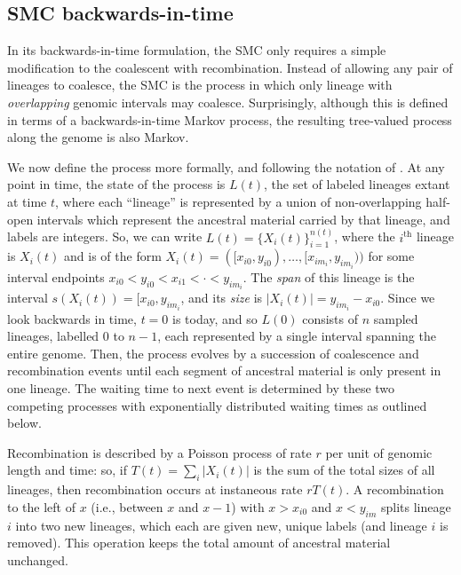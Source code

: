 \documentclass{article}
\begin{document}
\subsection{SMC backwards-in-time}\label{par:description}

In its backwards-in-time formulation, the SMC \citep{mcvean_approximating_2005} only requires a
simple modification to the coalescent with recombination.
Instead of allowing any pair of lineages to coalesce,
the SMC is the process in which only lineage with \emph{overlapping} genomic intervals may coalesce.
Surprisingly, although this is defined in terms of a backwards-in-time Markov process,
the resulting tree-valued process along the genome is also Markov.

We now define the process more formally,
and following the notation of \citet{mcvean_approximating_2005}.
At any point in time, the state of the process is $L(t)$,
the set of labeled lineages extant at time $t$,
where each ``lineage'' is represented by a union of non-overlapping half-open intervals
which represent the ancestral material carried by that lineage,
and labels are integers.
So, we can write $L(t) = \{X_i(t)\}_{i=1}^{n(t)}$,
where the $i^\text{th}$ lineage is $X_i(t)$
and is of the form
$X_i(t) = ([x_{i0}, y_{i0}), \dotsc, [x_{im_i}, y_{im_i}))$
for some interval endpoints $x_{i0} < y_{i0} < x_{i1} < \cdot < y_{im_i}$.
The \emph{span} of this lineage is the interval $s(X_i(t)) = [x_{i0}, y_{im_i}$,
and its \emph{size} is $|X_i(t)| = y_{im_i} - x_{i0}$.
Since we look backwards in time, $t=0$ is today, and so
$L(0)$ consists of $n$ sampled lineages, labelled $0$ to $n-1$,
each represented by a single interval spanning the entire genome.
Then, the process evolves by a succession of coalescence and recombination
events until each segment of ancestral material is only present in one lineage.
The waiting time to next event is determined by these two competing processes
with exponentially distributed waiting times as outlined below.

Recombination is described by a Poisson process of rate $r$ per unit of genomic length and time:
so, if $T(t) = \sum_i |X_i(t)|$ is the sum of the total sizes of all lineages,
then recombination occurs at instaneous rate $rT(t)$.
A recombination to the left of $x$
(i.e., between $x$ and $x-1$)
with $x>x_{i0}$ and $x<y_{im}$ splits lineage $i$ into two new lineages,
which each are given new, unique labels
(and lineage $i$ is removed).
This operation keeps the total amount of ancestral material unchanged.
\end{document}
